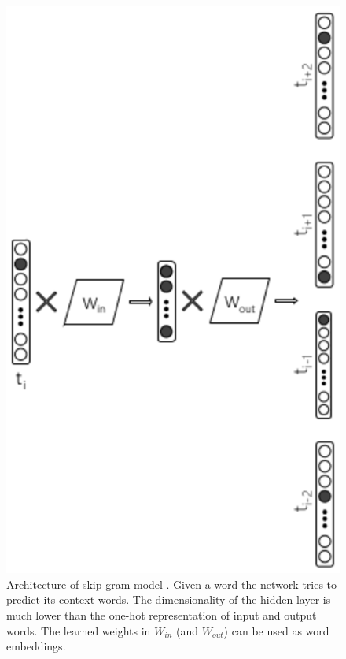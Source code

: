 \begin{figure}[t]
	\begin{center} 
    	\includegraphics[scale=0.99]{Figures/skip_gram.eps}
		\caption{Architecture of skip-gram model . Given a word the network tries to predict its context words. The dimensionality of the hidden layer is much lower than the one-hot representation of input and output words. The learned weights in $W_{in}$ (and $W_{out}$) can be used as word embeddings.}
		\label{chap:word_embeddingss:fig:skipgram_diagram}
	\end{center}
\end{figure}

